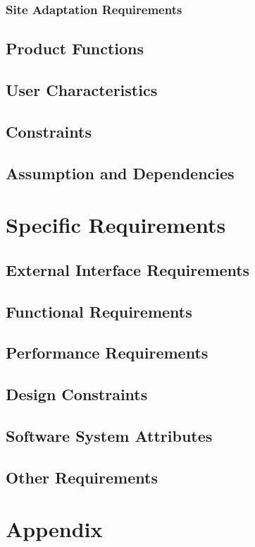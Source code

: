 \documentclass[a4paper,12pt]{article}
\begin{document}
\subsubsection{Site Adaptation Requirements}
\subsection{Product Functions}
\subsection{User Characteristics}
\subsection{Constraints}
\subsection{Assumption and Dependencies}

\section{Specific Requirements}
\subsection{External Interface Requirements}
\subsection{Functional Requirements}
\subsection{Performance Requirements}
\subsection{Design Constraints}
\subsection{Software System Attributes}
\subsection{Other Requirements}
\section{Appendix}
\newpage
\end{document}
